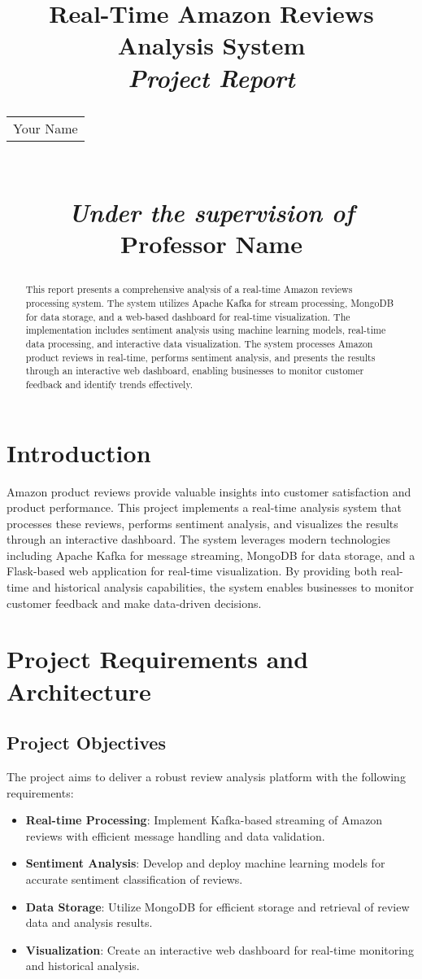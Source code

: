 \documentclass[11pt,a4paper,twocolumn]{article}
\title{
    \vspace*{2cm}
    \Huge\textbf{Real-Time Amazon Reviews Analysis System}\\[2cm]
    \Large\textit{Project Report}\\[3cm]
    \large
    \begin{tabular}{c}
        Your Name
    \end{tabular}\\[2cm]
    \normalsize
    \textit{Under the supervision of}\\[0.5cm]
    \large
    Professor Name\\[2cm]
    \vspace*{2cm}
}
\author{}
\date{}
\begin{document}
\maketitle
\thispagestyle{empty}
\newpage

\begin{abstract}
This report presents a comprehensive analysis of a real-time Amazon reviews processing system. The system utilizes Apache Kafka for stream processing, MongoDB for data storage, and a web-based dashboard for real-time visualization. The implementation includes sentiment analysis using machine learning models, real-time data processing, and interactive data visualization. The system processes Amazon product reviews in real-time, performs sentiment analysis, and presents the results through an interactive web dashboard, enabling businesses to monitor customer feedback and identify trends effectively.
\end{abstract}

\section{Introduction}
Amazon product reviews provide valuable insights into customer satisfaction and product performance. This project implements a real-time analysis system that processes these reviews, performs sentiment analysis, and visualizes the results through an interactive dashboard. The system leverages modern technologies including Apache Kafka for message streaming, MongoDB for data storage, and a Flask-based web application for real-time visualization. By providing both real-time and historical analysis capabilities, the system enables businesses to monitor customer feedback and make data-driven decisions.

\section{Project Requirements and Architecture}
\subsection{Project Objectives}
The project aims to deliver a robust review analysis platform with the following requirements:
\begin{itemize}
    \item \textbf{Real-time Processing}: Implement Kafka-based streaming of Amazon reviews with efficient message handling and data validation.
    \item \textbf{Sentiment Analysis}: Develop and deploy machine learning models for accurate sentiment classification of reviews.
    \item \textbf{Data Storage}: Utilize MongoDB for efficient storage and retrieval of review data and analysis results.
    \item \textbf{Visualization}: Create an interactive web dashboard for real-time monitoring and historical analysis.
\end{itemize}
\end{document}
